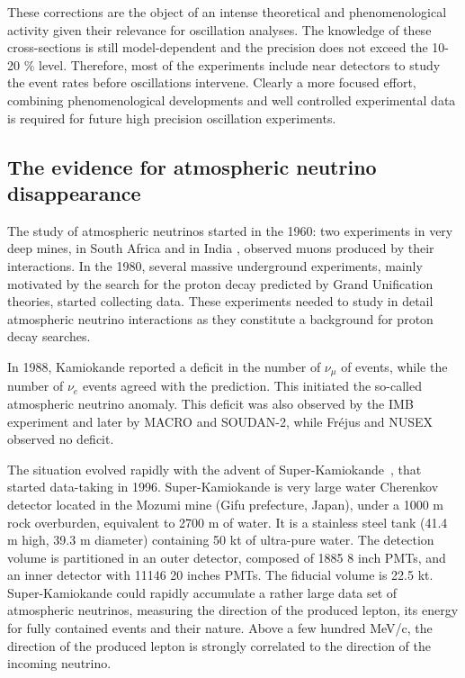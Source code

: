These corrections are the object of an intense theoretical and phenomenological activity \cite{zeller,martini} given their relevance for oscillation analyses. The knowledge of these cross-sections is still model-dependent and the precision does not exceed the 10-20 \% level. Therefore, most of the experiments include near detectors to study the event rates before oscillations intervene. Clearly a more focused effort, combining phenomenological developments and well controlled experimental data is required for future high precision oscillation experiments.


\subsection{The evidence for atmospheric neutrino disappearance}

The study of atmospheric neutrinos started in the 1960: two experiments in very deep mines, in South Africa \cite{Reines:1965qk} and in India \cite{Achar:1965ova}, observed muons produced by their interactions. 
In the 1980, several massive underground experiments, mainly motivated by the search for the proton decay predicted by Grand Unification theories, started collecting data. These experiments needed to study in detail atmospheric neutrino interactions as they constitute a background for proton decay searches.

In 1988, Kamiokande reported a deficit in the number of $\nu_\mu$ of events, while the number of $\nu_e$ events agreed with the prediction. This initiated the so-called atmospheric neutrino anomaly. This deficit was also observed by the IMB experiment and later by MACRO and SOUDAN-2, while Fr\'ejus and NUSEX observed no deficit. 

The situation evolved rapidly with the advent of Super-Kamiokande~\cite{sknim}, that started data-taking in 1996. Super-Kamiokande is very large water Cherenkov detector located in the Mozumi mine (Gifu prefecture, Japan), under a 1000 m rock overburden, equivalent to 2700 m of water. It is a stainless steel tank (41.4 m high, 39.3 m diameter) containing 50 kt of ultra-pure water. The detection volume is partitioned in an outer detector, composed of 1885 8 inch PMTs, and an inner detector with 11146 20 inches PMTs. The fiducial volume is 22.5 kt. Super-Kamiokande could rapidly accumulate a rather large data set of atmospheric neutrinos, measuring the direction of the produced lepton, its energy for fully contained events and their nature. Above a few hundred MeV/c, the direction of the produced lepton is strongly correlated to the direction of the incoming neutrino.

